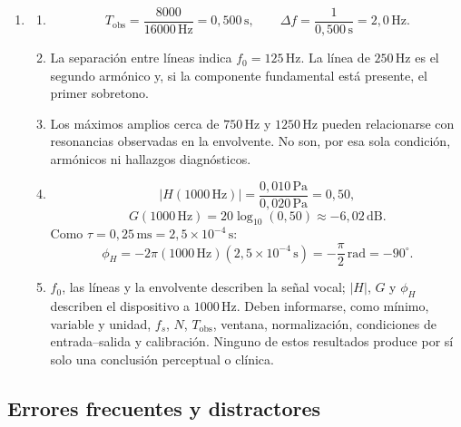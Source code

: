 \begin{enumerate}[label=\textbf{I\arabic*.},leftmargin=*]
    \item
    \begin{enumerate}[label=\alph*)]
        \item
        \[
            T_\mathrm{obs}
            =\frac{8000}{16000\,\text{Hz}}
            =0{,}500\,\text{s},
            \qquad
            \Delta f=\frac{1}{0{,}500\,\text{s}}
                    =2{,}0\,\text{Hz}.
        \]
        \item La separación entre líneas indica
        \(f_0=125\,\text{Hz}\). La línea de \(250\,\text{Hz}\) es el segundo
        armónico y, si la componente fundamental está presente, el primer
        sobretono.
        \item Los máximos amplios cerca de \(750\,\text{Hz}\) y
        \(1250\,\text{Hz}\) pueden relacionarse con resonancias observadas en
        la envolvente. No son, por esa sola condición, armónicos ni hallazgos
        diagnósticos.
        \item
        \[
            \lvert H(1000\,\text{Hz})\rvert
            =\frac{0{,}010\,\text{Pa}}{0{,}020\,\text{Pa}}
            =0{,}50,
        \]
        \[
            G(1000\,\text{Hz})
            =20\log_{10}(0{,}50)
            \approx-6{,}02\,\text{dB}.
        \]
        Como \(\tau=0{,}25\,\text{ms}
        =2{,}5\times10^{-4}\,\text{s}\):
        \[
            \phi_H=-2\pi(1000\,\text{Hz})
            (2{,}5\times10^{-4}\,\text{s})
            =-\frac{\pi}{2}\,\text{rad}
            =-90^\circ.
        \]
        \item \(f_0\), las líneas y la envolvente describen la señal vocal;
        \(\lvert H\rvert\), \(G\) y \(\phi_H\) describen el dispositivo a
        \(1000\,\text{Hz}\). Deben informarse, como mínimo, variable y unidad,
        \(f_s\), \(N\), \(T_\mathrm{obs}\), ventana, normalización, condiciones
        de entrada--salida y calibración. Ninguno de estos resultados produce
        por sí solo una conclusión perceptual o clínica.
    \end{enumerate}
\end{enumerate}

\subsection*{Errores frecuentes y distractores}

